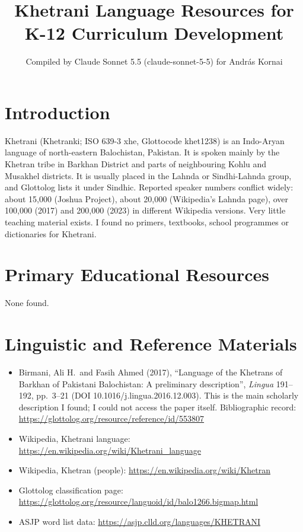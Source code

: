 \documentclass[12pt]{article}
\title{Khetrani Language Resources for K-12 Curriculum Development}
\author{Compiled by Claude Sonnet 5.5 (claude-sonnet-5-5) for Andr\'as Kornai}
\date{}
\begin{document}
\maketitle

\section{Introduction}
Khetrani (Khetranki; ISO 639-3 xhe, Glottocode khet1238) is an Indo-Aryan language of north-eastern Balochistan, Pakistan. It is spoken mainly by the Khetran tribe in Barkhan District and parts of neighbouring Kohlu and Musakhel districts. It is usually placed in the Lahnda or Sindhi-Lahnda group, and Glottolog lists it under Sindhic. Reported speaker numbers conflict widely: about 15,000 (Joshua Project), about 20,000 (Wikipedia's Lahnda page), over 100,000 (2017) and 200,000 (2023) in different Wikipedia versions. Very little teaching material exists. I found no primers, textbooks, school programmes or dictionaries for Khetrani.

\section{Primary Educational Resources}
None found.

\section{Linguistic and Reference Materials}
\begin{itemize}
\item Birmani, Ali H.\ and Fasih Ahmed (2017), ``Language of the Khetrans of Barkhan of Pakistani Balochistan: A preliminary description'', \emph{Lingua} 191--192, pp.\ 3--21 (DOI 10.1016/j.lingua.2016.12.003). This is the main scholarly description I found; I could not access the paper itself. Bibliographic record: \url{https://glottolog.org/resource/reference/id/553807}
\item Wikipedia, Khetrani language: \url{https://en.wikipedia.org/wiki/Khetrani_language}
\item Wikipedia, Khetran (people): \url{https://en.wikipedia.org/wiki/Khetran}
\item Glottolog classification page: \url{https://glottolog.org/resource/languoid/id/balo1266.bigmap.html}
\item ASJP word list data: \url{https://asjp.clld.org/languages/KHETRANI}
\end{itemize}
\end{document}

